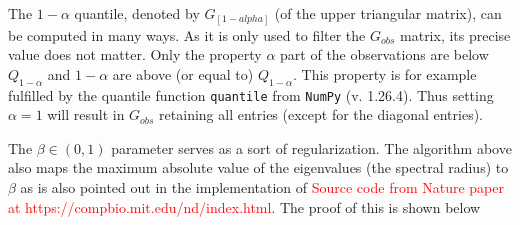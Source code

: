 \documentclass[../Thesis.tex]{subfiles}
\begin{document}
\begin{remark}
    The $1-\alpha$ quantile, denoted by $G_{[1-alpha]}$ (of the upper triangular matrix), can be computed in many ways. As it is only used to filter the $G_{obs}$ matrix, its precise value does not matter. Only the property $\alpha$ part of the observations are below $Q_{1-\alpha}$ and $1-\alpha$ are above (or equal to) $Q_{1-\alpha}$. This property is for example fulfilled by the quantile function \texttt{quantile} from \texttt{NumPy} (v. 1.26.4). Thus setting $\alpha = 1$ will result in $G_{obs}$ retaining all entries (except for the diagonal entries).
\end{remark}

\begin{remark}
    The $\beta \in (0,1)$ parameter serves as a sort of regularization. The algorithm above also maps the maximum absolute value of the eigenvalues (the spectral radius) to $\beta$ as is also pointed out in the implementation of \textcolor{red}{Source code from Nature paper at https://compbio.mit.edu/nd/index.html}. The proof of this is shown below
\end{remark}
\end{document}
